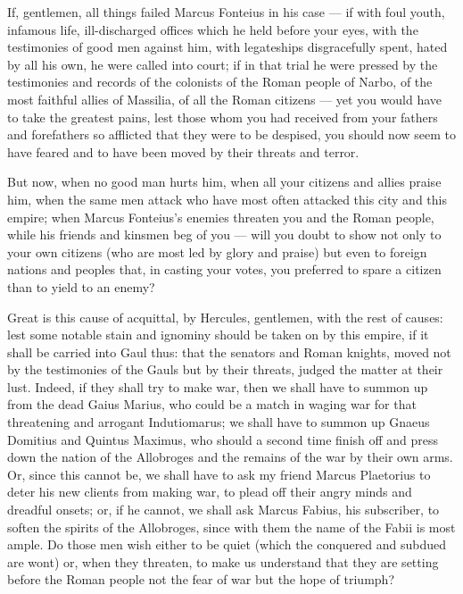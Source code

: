  If, gentlemen, all things failed Marcus Fonteius in his case --- if with foul youth, infamous life, ill-discharged offices which he held before your eyes, with the testimonies of good men against him, with legateships disgracefully spent, hated by all his own, he were called into court; if in that trial he were pressed by the testimonies and records of the colonists of the Roman people of Narbo, of the most faithful allies of Massilia, of all the Roman citizens --- yet you would have to take the greatest pains, lest those whom you had received from your fathers and forefathers so afflicted that they were to be despised, you should now seem to have feared and to have been moved by their threats and terror.

 But now, when no good man hurts him, when all your citizens and allies praise him, when the same men attack who have most often attacked this city and this empire; when Marcus Fonteius's enemies threaten you and the Roman people, while his friends and kinsmen beg of you --- will you doubt to show not only to your own citizens (who are most led by glory and praise) but even to foreign nations and peoples that, in casting your votes, you preferred to spare a citizen than to yield to an enemy?

 Great is this cause of acquittal, by Hercules, gentlemen, with the rest of causes: lest some notable stain and ignominy should be taken on by this empire, if it shall be carried into Gaul thus: that the senators and Roman knights, moved not by the testimonies of the Gauls but by their threats, judged the matter at their lust. Indeed, if they shall try to make war, then we shall have to summon up from the dead Gaius Marius, who could be a match in waging war for that threatening and arrogant Indutiomarus; we shall have to summon up Gnaeus Domitius and Quintus Maximus, who should a second time finish off and press down the nation of the Allobroges and the remains of the war by their own arms. Or, since this cannot be, we shall have to ask my friend Marcus Plaetorius to deter his new clients from making war, to plead off their angry minds and dreadful onsets; or, if he cannot, we shall ask Marcus Fabius, his subscriber, to soften the spirits of the Allobroges, since with them the name of the Fabii is most ample. Do those men wish either to be quiet (which the conquered and subdued are wont) or, when they threaten, to make us understand that they are setting before the Roman people not the fear of war but the hope of triumph?

